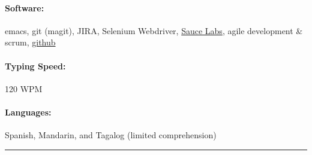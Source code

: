 \documentclass[10pt]{article}
\begin{document}
\paragraph{Software:} emacs, git (magit), JIRA, Selenium Webdriver, \href{http://www.saucelabs.com}{Sauce Labs}, agile development \&
  scrum, \href{http://www.github.com/gempesaw}{github}
\paragraph{Typing Speed:} 120 WPM
\paragraph{Languages:} Spanish, Mandarin, and Tagalog (limited comprehension)
%
\vfill
\hrule
\end{document}
